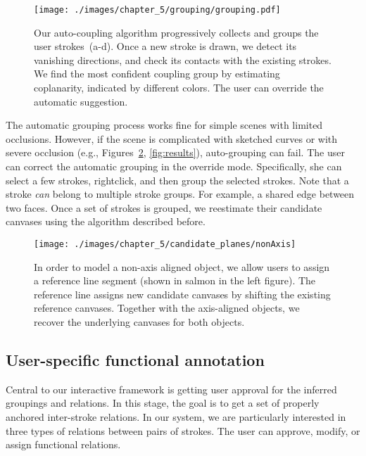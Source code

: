 \begin{figure}[b!]
  \texttt{[image: ./images/chapter\_5/grouping/grouping.pdf]}
  \caption{Our auto-coupling algorithm progressively collects and groups the user strokes~(a-d). Once a new stroke is drawn, we detect its vanishing directions, and check its contacts with the existing strokes. We find the most confident coupling group by estimating coplanarity, indicated by different colors. The user can override the automatic suggestion.
  }
  \label{fig:grouping}
  \vnudge
\end{figure}


The automatic grouping process works fine for simple scenes with limited occlusions. However, if the scene is complicated with sketched curves or with severe occlusion (e.g., Figures~\ref{fig:nonAxis}, \ref{fig:results}), auto-grouping can fail. The user can correct the automatic grouping in the override mode. Specifically, she can select a few strokes, rightclick, and then group the selected strokes. Note that a stroke {\em can} belong to multiple stroke groups. For example, a shared edge between two faces. Once a set of strokes is grouped, we reestimate their candidate canvases using the algorithm described before.

\begin{figure}[b!]
  \vnudge
  \texttt{[image: ./images/chapter\_5/candidate\_planes/nonAxis]}
  \caption{In order to model a non-axis aligned object, we allow users to assign a reference line segment (shown in salmon in the left figure). The reference line assigns new candidate canvases by shifting the existing reference canvases. Together with the axis-aligned objects, we recover the underlying canvases for both objects.
  \label{fig:nonAxis}}
\end{figure}

\subsection{User-specific functional annotation}

Central to our interactive framework is getting user approval for the inferred groupings and relations. In this stage, the goal is to get a set of properly anchored inter-stroke relations. In our system, we are particularly interested in three types of relations between pairs of strokes. The user can approve, modify, or assign functional relations.

